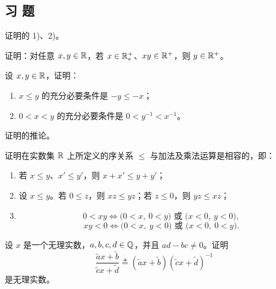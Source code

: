 \subsection{习 题}

\begin{exercise}
  \item 证明的 1)、2)。
\end{exercise}

\begin{exercise}
  \item 证明：对任意 \(x,y\in\mathbb{R}\)，若 \(x\in\mathbb{R}_*^+\)、\(xy\in\mathbb{R}^+\)，则
  \(y\in\mathbb{R}^+\)。
\end{exercise}

\begin{exercise}
  \item 设 \(x,y\in\mathbb{R}\)，证明：
  \begin{enumerate}[label=\arabic*)]
    \item \(x\leq y\) 的充分必要条件是 \(-y\leq-x\)；
    \item \(0<x<y\) 的充分必要条件是
    \(0<y^{-1}<x^{-1}\)。
  \end{enumerate}
\end{exercise}

\begin{exercise}
  \item 证明的推论。
\end{exercise}

\begin{exercise}
  \item 证明在实数集 \(\mathbb{R}\) 上所定义的序关系 \(\leq\) 与加法及乘法运算是相容的，即：
  \begin{enumerate}[label=\arabic*)]
    \item 若 \(x\leq y\)、\(x'\leq y'\)，则
    \(x+x'\leq y+y'\)；
    \item 设 \(x\leq y\)。若 \(0\leq z\)，则 \(xz\leq yz\)；若
    \(z\leq0\)，则 \(yz\leq xz\)；
    \item
    \[
    0<xy
    \iff
    \bigl(0<x,\ 0<y\bigr)\text{ 或 }\bigl(x<0,\ y<0\bigr),
    \]
    \[
    xy<0
    \iff
    \bigl(0<x,\ y<0\bigr)\text{ 或 }\bigl(x<0,\ 0<y\bigr).
    \]
  \end{enumerate}
\end{exercise}

\begin{exercise}
  \item 设 \(x\) 是一个无理实数，\(a,b,c,d\in\mathbb{Q}\)，并且
  \(ad-bc\neq0\)。证明
  \[
  \frac{\widetilde a x+\widetilde b}{\widetilde c x+\widetilde d}
  \mathrel{\triangleq}
  (\widetilde a x+\widetilde b)
  (\widetilde c x+\widetilde d)^{-1}
  \]
  是无理实数。
\end{exercise}

